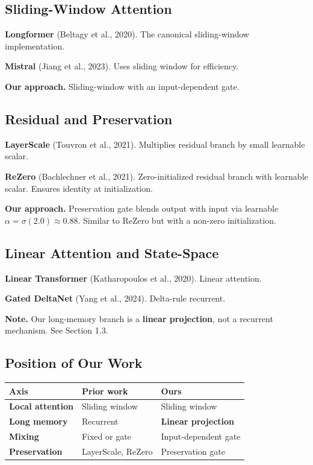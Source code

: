 \subsection{Sliding-Window Attention}

\textbf{Longformer} (Beltagy et al., 2020). The canonical sliding-window 
implementation.

\textbf{Mistral} (Jiang et al., 2023). Uses sliding window for efficiency.

\textbf{Our approach.} Sliding-window with an input-dependent gate.

\subsection{Residual and Preservation}

\textbf{LayerScale} (Touvron et al., 2021). Multiplies residual branch by small 
learnable scalar.

\textbf{ReZero} (Bachlechner et al., 2021). Zero-initialized residual branch 
with learnable scalar. Ensures identity at initialization.

\textbf{Our approach.} Preservation gate blends output with input via learnable 
$\alpha = \sigma(2.0) \approx 0.88$. Similar to ReZero but with a 
non-zero initialization.

\subsection{Linear Attention and State-Space}

\textbf{Linear Transformer} (Katharopoulos et al., 2020). Linear attention.

\textbf{Gated DeltaNet} (Yang et al., 2024). Delta-rule recurrent.

\textbf{Note.} Our long-memory branch is a \textbf{linear projection}, not a recurrent 
mechanism. See Section 1.3.

\subsection{Position of Our Work}

\begin{table}[H]
\centering
\small
\begin{tabular}{lll}
\toprule
\textbf{Axis} & \textbf{Prior work} & \textbf{Ours} \\
\midrule
\textbf{Local attention} & Sliding window & Sliding window \\
\textbf{Long memory} & Recurrent & \textbf{Linear projection} \\
\textbf{Mixing} & Fixed or gate & Input-dependent gate \\
\textbf{Preservation} & LayerScale, ReZero & Preservation gate \\
\bottomrule
\end{tabular}
\end{table}


